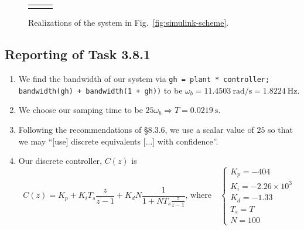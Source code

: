 \documentclass[11pt]{article} %
\begin{document}
\begin{enumerate}
\begin{figure}
\begin{tabular}{cc}
      &
      &
      \\
    \end{tabular}
    \caption{Realizations of the system in Fig.~\ref{fig:simulink-scheme}.}
  \end{figure}
\end{enumerate}

\subsection*{Reporting of Task 3.8.1}
\begin{enumerate}
\item We find the bandwidth of our system via \texttt{gh = plant *
    controller; bandwidth(gh) + bandwidth(1 + gh))} to be
  $\omega_b = 11.4503~\text{rad/s} = 1.8224~\text{Hz}$.
\item We choose our samping time to be
  $25\omega_b \Rightarrow T = 0.0219~\text{s}$.
\item Following the recommendations of §8.3.6, we use a scalar value
  of $25$ so that we may ``[use] discrete equivalents [...] with
  confidence''.
\item
  Our discrete controller, $C(z)$ is
  \begin{equation}
    C(z) =
    K_p
    + K_i T_s\frac{z}{z - 1}
    + K_d N \frac{1}{1 + N T_s \frac{z}{z-1}}
    \text{, where}
    \quad
    \begin{cases}
      K_p = -404 \\
      K_i = -2.26 \times 10^{3} \\
      K_d = -1.33 \\
      T_s = T \\
      N = 100
    \end{cases}
  \end{equation}
\end{enumerate}
\end{document}
